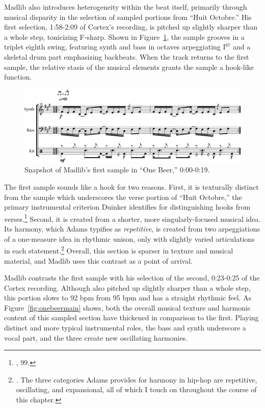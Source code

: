 Madlib also introduces heterogeneity within the beat itself, primarily through musical disparity in 
the selection of sampled portions from ``Huit Octobre.'' His first selection, 1:58-2:09 of Cortex's
recording, is pitched up slightly sharper than a whole step, tonicizing F-sharp. Shown in
Figure~\ref{fig:onebeerintro}, the sample grooves in a triplet eighth swing, featuring synth and bass 
in octaves arpeggiating I$^{b7}$ and a skeletal drum part emphasizing backbeats. When the track returns 
to the first sample, the relative stasis of the musical elements grants the sample a hook-like function.

    \begin{figure}[ht]
        \centering
        \includegraphics[width=\textwidth]{images/figures/chp 02/000019onebeerintro.pdf}
        \caption{Snapshot of Madlib's first sample in ``One Beer,'' 0:00-0:19.}
        \label{fig:onebeerintro}
    \end{figure}

The first sample sounds like a hook for two reasons. First, it is texturally distinct from the sample 
which underscores the verse portion of ``Huit Octobre,'' the primary instrumental criterion Duinker
identifies for distinguishing hooks from verses.\footnote{\cite{benduinkerSongFormMainstreaming2020}, 99.}
Second, it is created from a shorter, more singularly-focused musical idea. Its harmony, which Adams 
typifies as \emph{repetitive}, is created from two arpeggiations of a one-measure idea in rhythmic unison,
only with slightly varied articulations in each statement.\footnote{\cite{kyleadamsHarmonicSyntacticMotivic2020}. The three categories Adams provides 
for harmony in hip-hop are repetitive, oscillating, and expansional, all of which I touch on throughout 
the course of this chapter.} Overall, this section is sparser in texture and musical material, and 
Madlib uses this contrast as a point of arrival.

Madlib contrasts the first sample with his selection of the second, 0:23-0:25 of the Cortex recording.
Although also pitched up slightly sharper than a whole step, this portion slows to 92 bpm from 95 bpm 
and has a straight rhythmic feel. As Figure~\ref{fig:onebeermain} shows, both the overall musical texture
and harmonic content of this sampled section have thickened in comparison to the first. Playing distinct 
and more typical instrumental roles, the bass and synth underscore a vocal part, and the three create new
oscillating harmonies.

